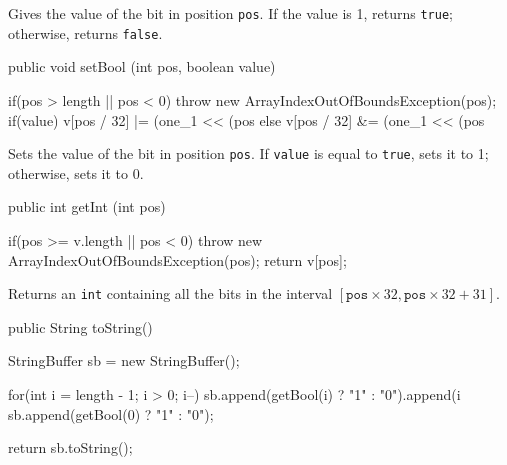 \begin{tabb} Gives the value of the bit in position \texttt{pos}. If the
  value is 1, returns \texttt{true}; otherwise, returns \texttt{false}.
\end{tabb}
\begin{htmlonly}
\end{htmlonly}
\begin{code}

   public void setBool (int pos, boolean value) \begin{hide} {
      if(pos > length || pos < 0)
         throw new ArrayIndexOutOfBoundsException(pos);
      if(value)
         v[pos / 32] |= (one_1 << (pos %
      else
         v[pos / 32] &= (one_1 << (pos %
   } \end{hide}
\end{code}
\begin{tabb} Sets the value of the bit in position \texttt{pos}. If \texttt{value}
  is equal to \texttt{true}, sets it to 1; otherwise, sets it to 0.
\end{tabb}
\begin{htmlonly}
\end{htmlonly}
\begin{code}

   public int getInt (int pos) \begin{hide} {
      if(pos >= v.length || pos < 0)
         throw new ArrayIndexOutOfBoundsException(pos);
      return v[pos];
   } \end{hide}
\end{code}
\begin{tabb} Returns an \texttt{int} containing all the bits in the interval
  $[\mathtt{pos} \times 32, \mathtt{pos} \times 32 + 31]$.
\end{tabb}
\begin{htmlonly}
\end{htmlonly}
\begin{code}

   public String toString() \begin{hide} {
      StringBuffer sb = new StringBuffer();

      for(int i = length - 1; i > 0; i--)
         sb.append(getBool(i) ? "1" : "0").append(i%
      sb.append(getBool(0) ? "1" : "0");

      return sb.toString();
   } \end{hide}
\end{code}
